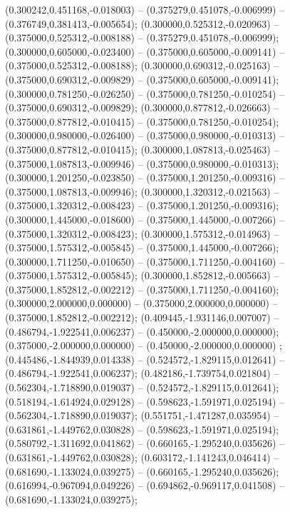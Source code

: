  (0.300242,0.451168,-0.018003) -- (0.375279,0.451078,-0.006999) -- (0.376749,0.381413,-0.005654);
 (0.300000,0.525312,-0.020963) -- (0.375000,0.525312,-0.008188) -- (0.375279,0.451078,-0.006999);
 (0.300000,0.605000,-0.023400) -- (0.375000,0.605000,-0.009141) -- (0.375000,0.525312,-0.008188);
 (0.300000,0.690312,-0.025163) -- (0.375000,0.690312,-0.009829) -- (0.375000,0.605000,-0.009141);
 (0.300000,0.781250,-0.026250) -- (0.375000,0.781250,-0.010254) -- (0.375000,0.690312,-0.009829);
 (0.300000,0.877812,-0.026663) -- (0.375000,0.877812,-0.010415) -- (0.375000,0.781250,-0.010254);
 (0.300000,0.980000,-0.026400) -- (0.375000,0.980000,-0.010313) -- (0.375000,0.877812,-0.010415);
 (0.300000,1.087813,-0.025463) -- (0.375000,1.087813,-0.009946) -- (0.375000,0.980000,-0.010313);
 (0.300000,1.201250,-0.023850) -- (0.375000,1.201250,-0.009316) -- (0.375000,1.087813,-0.009946);
 (0.300000,1.320312,-0.021563) -- (0.375000,1.320312,-0.008423) -- (0.375000,1.201250,-0.009316);
 (0.300000,1.445000,-0.018600) -- (0.375000,1.445000,-0.007266) -- (0.375000,1.320312,-0.008423);
 (0.300000,1.575312,-0.014963) -- (0.375000,1.575312,-0.005845) -- (0.375000,1.445000,-0.007266);
 (0.300000,1.711250,-0.010650) -- (0.375000,1.711250,-0.004160) -- (0.375000,1.575312,-0.005845);
 (0.300000,1.852812,-0.005663) -- (0.375000,1.852812,-0.002212) -- (0.375000,1.711250,-0.004160);
 (0.300000,2.000000,0.000000) -- (0.375000,2.000000,0.000000) -- (0.375000,1.852812,-0.002212);
 (0.409445,-1.931146,0.007007) -- (0.486794,-1.922541,0.006237) -- (0.450000,-2.000000,0.000000);
 (0.375000,-2.000000,0.000000) -- (0.450000,-2.000000,0.000000) ;
 (0.445486,-1.844939,0.014338) -- (0.524572,-1.829115,0.012641) -- (0.486794,-1.922541,0.006237);
 (0.482186,-1.739754,0.021804) -- (0.562304,-1.718890,0.019037) -- (0.524572,-1.829115,0.012641);
 (0.518194,-1.614924,0.029128) -- (0.598623,-1.591971,0.025194) -- (0.562304,-1.718890,0.019037);
 (0.551751,-1.471287,0.035954) -- (0.631861,-1.449762,0.030828) -- (0.598623,-1.591971,0.025194);
 (0.580792,-1.311692,0.041862) -- (0.660165,-1.295240,0.035626) -- (0.631861,-1.449762,0.030828);
 (0.603172,-1.141243,0.046414) -- (0.681690,-1.133024,0.039275) -- (0.660165,-1.295240,0.035626);
 (0.616994,-0.967094,0.049226) -- (0.694862,-0.969117,0.041508) -- (0.681690,-1.133024,0.039275);
